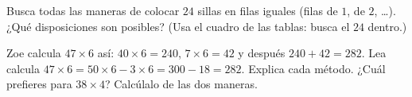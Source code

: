 \begin{exercise}[$\star\star$]\label{exo:g3:mult:11}
Busca todas las maneras de colocar $24$ sillas en filas iguales (filas de
$1$, de $2$, \dots). ¿Qué disposiciones son posibles? (Usa el cuadro
de las tablas: busca el $24$ dentro.)
\end{exercise}

\begin{exercise}[$\star\star$]\label{exo:g3:mult:12}
Zoe calcula $47 \times 6$ así: $40 \times 6 = 240$,
$7 \times 6 = 42$ y después $240 + 42 = 282$. Lea calcula
$47 \times 6 = 50 \times 6 - 3 \times 6 = 300 - 18 = 282$. Explica
cada método. ¿Cuál prefieres para $38 \times 4$? Calcúlalo de las dos
maneras.
\end{exercise}
